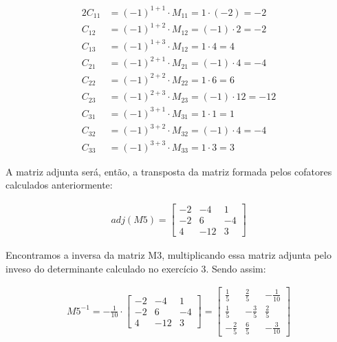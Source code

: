 \documentclass[a4paper,12pt]{article}
\begin{document}
\begin{alignat*}{2}
  C_{11} &= (-1)^{1+1} \cdot M_{11} = 1 \cdot (-2) = -2\\
  C_{12} &= (-1)^{1+2} \cdot M_{12} = (-1) \cdot 2 = -2\\
  C_{13} &= (-1)^{1+3} \cdot M_{12} = 1 \cdot 4 = 4\\
  C_{21} &= (-1)^{2+1} \cdot M_{21} = (-1) \cdot 4 = -4\\
  C_{22} &= (-1)^{2+2} \cdot M_{22} = 1 \cdot 6 = 6\\
  C_{23} &= (-1)^{2+3} \cdot M_{23} = (-1) \cdot 12 = -12\\
  C_{31} &= (-1)^{3+1} \cdot M_{31} = 1 \cdot 1 = 1\\
  C_{32} &= (-1)^{3+2} \cdot M_{32} = (-1) \cdot 4 = -4\\
  C_{33} &= (-1)^{3+3} \cdot M_{33} = 1 \cdot 3 = 3
\end{alignat*}

\newpage
A matriz adjunta será, então, a transposta da matriz formada pelos cofatores calculados anteriormente:

\begin{align*}
  adj(M5) = 
  \begin{bmatrix}
    -2 & -4 & 1\\
    -2 & 6 & -4\\
    4 & -12 & 3
  \end{bmatrix}  
\end{align*}

Encontramos a inversa da matriz M3, multiplicando essa matriz adjunta pelo inveso do determinante calculado no exercício 3. Sendo assim:

\begin{align*}
  M5^{-1} = -\frac{1}{10} \cdot
  \begin{bmatrix}
    -2 & -4 & 1\\
    -2 & 6 & -4\\
    4 & -12 & 3
  \end{bmatrix}  
  =
  \begin{bmatrix}
    \frac{1}{5} & \frac{2}{5} & -\frac{1}{10}\\
    \frac{1}{5} & -\frac{3}{5} & \frac{2}{5}\\
    -\frac{2}{5} & \frac{6}{5} & -\frac{3}{10}
  \end{bmatrix}  
\end{align*}
\end{document}
